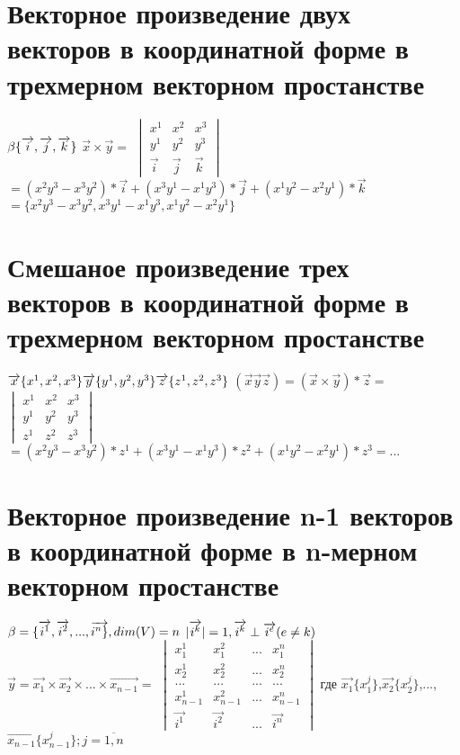 \documentclass{book}
\begin{document}
\section{Векторное произведение двух векторов в координатной форме в трехмерном векторном простанстве}
$\beta\{\overrightarrow{i},\overrightarrow{j},\overrightarrow{k}\}\\$
$\overrightarrow{x}\times\overrightarrow{y}=$
$\begin{vmatrix}
    x^1 & x^2 & x^3\\
    y^1 & y^2 & y^3\\
    \overrightarrow{i} & \overrightarrow{j} & \overrightarrow{k}
\end{vmatrix}$
$=(x^2y^3-x^3y^2)*\overrightarrow{i}+(x^3y^1-x^1y^3)*\overrightarrow{j}+(x^1y^2-x^2y^1)*\overrightarrow{k}$
$=\{x^2y^3-x^3y^2,x^3y^1-x^1y^3,x^1y^2-x^2y^1\}$
\section{Смешаное произведение трех векторов в координатной форме в трехмерном векторном простанстве}
$\overrightarrow{x}\{x^1,x^2,x^3\}  \overrightarrow{y}\{y^1,y^2,y^3\}  \overrightarrow{z}\{z^1,z^2,z^3\}\\$
$(\overrightarrow{x}\overrightarrow{y}\overrightarrow{z})=(\overrightarrow{x}\times\overrightarrow{y})*\overrightarrow{z}=$
$\begin{vmatrix}
    x^1 & x^2 & x^3\\
    y^1 & y^2 & y^3\\
    z^1 & z^2 & z^3
\end{vmatrix}$
$=(x^2y^3-x^3y^2)*z^1+(x^3y^1-x^1y^3)*z^2+(x^1y^2-x^2y^1)*z^3=...$
\section{Векторное произведение n-1 векторов в координатной форме в n-мерном векторном простанстве}
$\beta=\{\overrightarrow{i^1},\overrightarrow{i^2},...,\overrightarrow{i^n\}}, dim(V)=n\\$
$|\overrightarrow{i^k}|=1, \overrightarrow{i^k} \perp \overrightarrow{i^e} (e \neq k)\\$
$\overrightarrow{y}=\overrightarrow{x_1}\times\overrightarrow{x_2}\times...\times\overrightarrow{x_{n-1}}=$
$\begin{vmatrix}
    x_1^1 & x_1^2 & ... & x_1^n\\
    x_2^1 & x_2^2 & ... & x_2^n\\
    ... & ... & ... & ...\\
    x_{n-1}^1 & x_{n-1}^2 & ... & x_{n-1}^n\\
    \overrightarrow{i^1} & \overrightarrow{i^2} & ... & \overrightarrow{i^n}
\end{vmatrix}$ где $\overrightarrow{x_1}\{x^j_1\}$,$\overrightarrow{x_2}\{x^j_2\}$,...,$\overrightarrow{x_{n-1}}\{x^j_{n-1}\}; j=\overline{1,n}$
\end{document}
